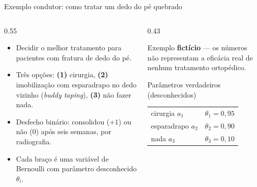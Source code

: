 \documentclass[aspectratio=169, 10pt]{beamer}
\begin{document}
\begin{frame}{Exemplo condutor: como tratar um dedo do pé quebrado}
  \begin{columns}[T]
    \begin{column}{0.55\textwidth}
      \begin{itemize}
        \item Decidir o melhor tratamento para pacientes com fratura de
              dedo do pé.
        \item Três opções: \textbf{(1)} cirurgia, \textbf{(2)}
              imobilização com esparadrapo no dedo vizinho
              (\emph{buddy taping}), \textbf{(3)} não fazer nada.
        \item Desfecho binário: consolidou ($+1$) ou não ($0$) após seis
              semanas, por radiografia.
        \item Cada braço é uma variável de Bernoulli com parâmetro
              desconhecido $\theta_i$.
      \end{itemize}
    \end{column}
    \begin{column}{0.43\textwidth}
      \begin{alertabox}
        Exemplo \textbf{fictício} — os números não representam a eficácia
        real de nenhum tratamento ortopédico.
      \end{alertabox}
      \begin{defbox}{Parâmetros verdadeiros (desconhecidos)}
        \centering\small
        \begin{tabular}{lc}
          cirurgia $a_1$     & $\theta_1 = 0{,}95$ \\
          esparadrapo $a_2$  & $\theta_2 = 0{,}90$ \\
          nada $a_3$         & $\theta_3 = 0{,}10$ \\
        \end{tabular}
      \end{defbox}
    \end{column}
  \end{columns}
\end{frame}
\end{document}
